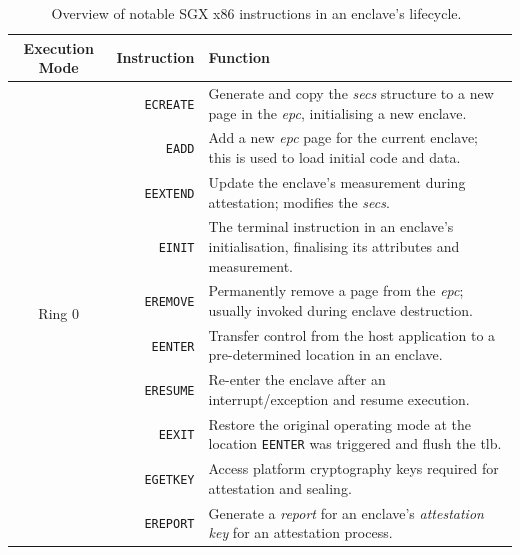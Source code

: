 \begin{table}
    \centering
    \newcommand\tableTop{\rule{0pt}{3ex}}
    \newcommand\tableMid{\rule{0pt}{3ex}}
    \newcommand\tableBottom{\rule[-2ex]{0pt}{0pt}}
    \begin{tabular}{|c|r|p{8.5cm}|} 
        \hline
        Execution Mode & Instruction & Function \\ [0.1ex] 
        \hline\hline
        \multirow{11}{*}{Ring 0} 
            & \tableTop{\texttt{ECREATE}} & \tableTop{Generate and copy the \textit{\acrshort{secs}} structure to a new page in the \textit{\acrshort{epc}}, initialising a new enclave.} \\ 
            & \texttt{EADD} & \tableMid{Add a new \textit{\acrshort{epc}} page for the current enclave; this is used to load initial code and data.} \\ 
            & \texttt{EEXTEND} & \tableMid{Update the enclave's measurement during attestation; modifies the \textit{\acrshort{secs}}.} \\ 
            & \texttt{EINIT} & \tableMid{The terminal instruction in an enclave's initialisation, finalising its attributes and measurement.} \\ 
            & \texttt{EREMOVE} & \tableMid{Permanently remove a page from the \textit{\acrshort{epc}}; usually invoked during enclave destruction.} \tableBottom \\ 
        \hline\hline
        \multirow{11}{*}{Ring 3} 
        & \tableTop{\texttt{EENTER}} & \tableTop{Transfer control from the host application to a pre-determined location in an enclave.} \\ 
        & \texttt{ERESUME} & \tableMid{Re-enter the enclave after an interrupt/exception and resume execution.} \\ 
        & \texttt{EEXIT} & \tableMid{Restore the original operating mode at the location \texttt{EENTER} was triggered and flush the \acrshort{tlb}.} \\ 
        & \texttt{EGETKEY} & \tableMid{Access platform cryptography keys required for attestation and sealing.} \\ 
        & \texttt{EREPORT} & \tableMid{Generate a \textit{report} for an enclave's \textit{attestation key} for an attestation process.} \tableBottom \\ 
        \hline
    \end{tabular}
    \vspace{5mm}
    \caption[Overview of notable SGX x86 instructions in an enclave's lifecycle.]{Overview of notable SGX x86 instructions in an enclave's lifecycle.~\cite{sgx-prog-reference}}
    \label{table:sgx-instructions}
\end{table}


